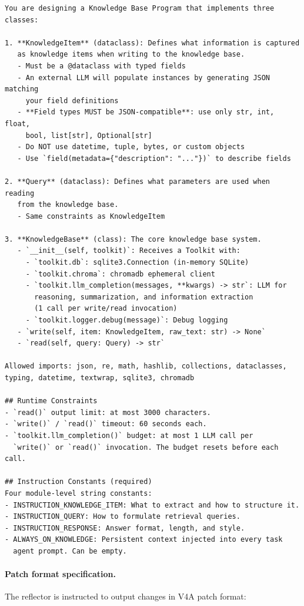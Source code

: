 \begin{lstlisting}[style=evolvedcode, basicstyle=\ttfamily\scriptsize]
You are designing a Knowledge Base Program that implements three classes:

1. **KnowledgeItem** (dataclass): Defines what information is captured
   as knowledge items when writing to the knowledge base.
   - Must be a @dataclass with typed fields
   - An external LLM will populate instances by generating JSON matching
     your field definitions
   - **Field types MUST be JSON-compatible**: use only str, int, float,
     bool, list[str], Optional[str]
   - Do NOT use datetime, tuple, bytes, or custom objects
   - Use `field(metadata={"description": "..."})` to describe fields

2. **Query** (dataclass): Defines what parameters are used when reading
   from the knowledge base.
   - Same constraints as KnowledgeItem

3. **KnowledgeBase** (class): The core knowledge base system.
   - `__init__(self, toolkit)`: Receives a Toolkit with:
     - `toolkit.db`: sqlite3.Connection (in-memory SQLite)
     - `toolkit.chroma`: chromadb ephemeral client
     - `toolkit.llm_completion(messages, **kwargs) -> str`: LLM for
       reasoning, summarization, and information extraction
       (1 call per write/read invocation)
     - `toolkit.logger.debug(message)`: Debug logging
   - `write(self, item: KnowledgeItem, raw_text: str) -> None`
   - `read(self, query: Query) -> str`

Allowed imports: json, re, math, hashlib, collections, dataclasses,
typing, datetime, textwrap, sqlite3, chromadb

## Runtime Constraints
- `read()` output limit: at most 3000 characters.
- `write()` / `read()` timeout: 60 seconds each.
- `toolkit.llm_completion()` budget: at most 1 LLM call per
  `write()` or `read()` invocation. The budget resets before each call.

## Instruction Constants (required)
Four module-level string constants:
- INSTRUCTION_KNOWLEDGE_ITEM: What to extract and how to structure it.
- INSTRUCTION_QUERY: How to formulate retrieval queries.
- INSTRUCTION_RESPONSE: Answer format, length, and style.
- ALWAYS_ON_KNOWLEDGE: Persistent context injected into every task
  agent prompt. Can be empty.
\end{lstlisting}

\paragraph{Patch format specification.}
The reflector is instructed to output changes in V4A patch format:

